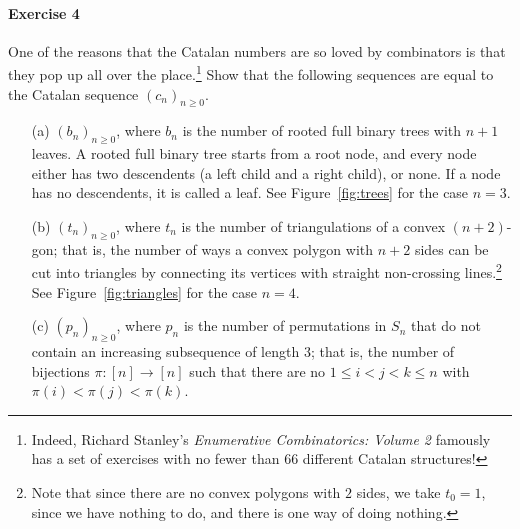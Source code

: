 \documentclass[a4paper,12pt]{article}
\begin{document}
\paragraph{Exercise 4}  One of the reasons that the Catalan numbers are so loved by combinators is that they pop up all over the place.\footnote{Indeed, Richard Stanley's \emph{Enumerative Combinatorics: Volume 2} famously has a set of exercises with no fewer than $66$ different Catalan structures!}  Show that the following sequences are equal to the Catalan sequence $(c_n)_{n \ge 0}$.
\begin{itemize}
	\item[(a)] $(b_n)_{n \ge 0}$, where $b_n$ is the number of rooted full binary trees with $n+1$ leaves.  A rooted full binary tree starts from a root node, and every node either has two descendents (a left child and a right child), or none.  If a node has no descendents, it is called a leaf.  See Figure~\ref{fig:trees} for the case $n = 3$.
\begin{comment}
	\begin{figure}[p]
\texttt{[image: catFBT.png]}
\caption{Rooted full binary trees with $4$ leaves. (Thanks Wikipedia!)}
\label{fig:trees}
\end{figure}
\end{comment}
	\item[(b)] $(t_n)_{n \ge 0}$, where $t_n$ is the number of triangulations of a convex $(n+2)$-gon; that is, the number of ways a convex polygon with $n+2$ sides can be cut into triangles by connecting its vertices with straight non-crossing lines.\footnote{Note that since there are no convex polygons with $2$ sides, we take $t_0 = 1$, since we have nothing to do, and there is one way of doing nothing.}  See Figure~\ref{fig:triangles} for the case $n = 4$.
\begin{comment}
	\begin{figure}[p]
\texttt{[image: catHEX.png]}
\caption{Triangulations of hexagons. (Thanks again, Wikipedia!)}
\label{fig:triangles}
\end{figure}
\end{comment}
	\item[(c)] $(p_n)_{n \ge 0}$, where $p_n$ is the number of permutations in $S_n$ that do not contain an increasing subsequence of length $3$; that is, the number of bijections $\pi: [n] \to [n]$ such that there are no $1 \le i < j < k \le n$ with $\pi(i) < \pi(j) < \pi(k)$.
\end{itemize}
\end{document}
